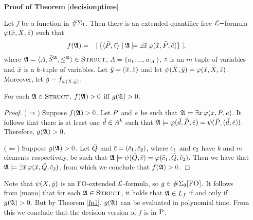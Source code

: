 %
%
	
\textbf{Proof of Theorem \ref{decisionptime}}

Let $f$ be a function in $\E{1}$. Then there is an extended quantifier-free $\L-$formula $\varphi(\x,\X,\z)$ such that
\begin{eqnarray*}
	f(\A) &=& \mid \{ \langle\P,\e\rangle \mid \A \models \exists \x \, \varphi(\x,\P,\e) \} \mid,
\end{eqnarray*}
where $\A = \langle A, \S^{\A}, \leq^{\A} \rangle \in \str$, $A = \{a_1,\ldots,a_{\vert A \vert}\}$, $\z$ is an $m$-tuple of variables and $\x$ is a $k$-tuple of variables. Let $\y = (\x,\z)$ and let $\psi(\X,\y) = \varphi(\x,\X,\z)$. Moreover, let $g = f_{\psi(\X,\y)}$.
\begin{claim} \label{mono}
	For each $\A \in \str$, $f(\A) > 0$ iff $g(\A) > 0$.
\end{claim}
\begin{proof}
	($\Rightarrow$) Suppose $f(\A) > 0$. Let $\P$ and $\e$ be such that $\A \models \exists \x \, \varphi(\x,\P,\e)$. It follows that there is at least one $\d \in A^k$ such that $\A \models \varphi(\d,\P,\e) = \psi(\P,(\d,\e))$. Therefore, $g(\A) > 0$. 
	
	($\Leftarrow$) Suppose $g(\A) > 0$. Let $\Q$ and $\c = (\c_1,\c_2)$, where $\c_1$ and $\c_2$ have $k$ and $m$ elements respectively, be such that $\A \models \psi(\Q,\c) = \varphi(\c_1,\Q,\c_2)$. Then we have that $\A \models \exists \x \, \varphi(\x,\Q,\c_2)$, from which we conclude that $f(\A) > 0$.
\end{proof}
Note that $\psi(\X,\y)$ is an {\sc FO}-extended $\L$-formula, so $g \in\XE{0}$. It follows from \ref{mono} that for each $\A \in \str$, it holds that $\A \in L_f$ if and only if $g(\A) > 0$. But by Theorem \ref{fp1}, $g(\A)$ can be evaluated in polynomial time. From this we conclude that the decision version of $f$ is in $\ptime$.
	
